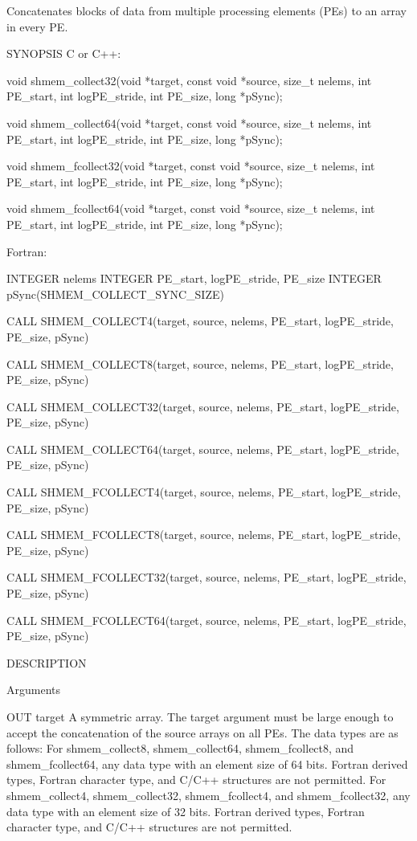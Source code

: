        Concatenates blocks of data from multiple processing
       elements (PEs) to an array in every PE.

SYNOPSIS
       C or C++:

	  void shmem_collect32(void *target, const void *source, size_t nelems,
	  int PE_start, int logPE_stride, int PE_size, long *pSync);

	  void shmem_collect64(void *target, const void *source, size_t nelems,
	  int PE_start, int logPE_stride, int PE_size, long *pSync);

	  void	shmem_fcollect32(void  *target,	 const	void  *source,	size_t
	  nelems, int PE_start, int logPE_stride, int PE_size, long *pSync);

	  void	shmem_fcollect64(void  *target,	 const	void  *source,	size_t
	  nelems, int PE_start, int logPE_stride, int PE_size, long *pSync);

       Fortran:

	  INTEGER nelems
	  INTEGER PE_start, logPE_stride, PE_size
	  INTEGER pSync(SHMEM_COLLECT_SYNC_SIZE)

	  CALL SHMEM_COLLECT4(target, source, nelems,  PE_start,	 logPE_stride,
	  PE_size, pSync)

	  CALL	SHMEM_COLLECT8(target,	source, nelems, PE_start, logPE_stride,
	  PE_size, pSync)

	  CALL SHMEM_COLLECT32(target, source, nelems, PE_start,	 logPE_stride,
	  PE_size, pSync)

	  CALL	SHMEM_COLLECT64(target, source, nelems, PE_start, logPE_stride,
	  PE_size, pSync)

	  CALL SHMEM_FCOLLECT4(target, source, nelems, PE_start,	 logPE_stride,
	  PE_size, pSync)

	  CALL	SHMEM_FCOLLECT8(target, source, nelems, PE_start, logPE_stride,
	  PE_size, pSync)

	  CALL SHMEM_FCOLLECT32(target, source, nelems, PE_start, logPE_stride,
	  PE_size, pSync)

	  CALL SHMEM_FCOLLECT64(target, source, nelems, PE_start, logPE_stride,
	  PE_size, pSync)

DESCRIPTION

Arguments

	OUT       target	    A symmetric array.	The  target  argument  must  be	 large
		    enough to accept the concatenation of the source arrays on
		    all PEs.  The data types are as follows:
		    For shmem_collect8, shmem_collect64, shmem_fcollect8,  and
		    shmem_fcollect64, any data type with an element size of 64
		    bits.  Fortran derived types, Fortran character type,  and
		    C/C++  structures  are not permitted.  For shmem_collect4,
		    shmem_collect32,  shmem_fcollect4,	and  shmem_fcollect32,
		    any	 data  type  with an element size of 32 bits.  Fortran
		    derived  types,  Fortran   character   type,   and	 C/C++
		    structures are not permitted.

